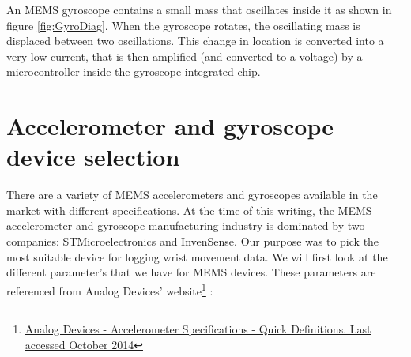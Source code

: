 An MEMS gyroscope contains a small mass that oscillates inside it as shown in figure \ref{fig:GyroDiag}. When the gyroscope rotates, the oscillating mass is displaced between two oscillations. This change in location is converted into a very low current, that is then amplified (and converted to a voltage) by a microcontroller inside the gyroscope integrated chip.

\section{Accelerometer and gyroscope device selection}
There are a variety of MEMS accelerometers and gyroscopes available in the market
with different specifications.
At the time of this writing, the MEMS accelerometer and gyroscope
manufacturing industry is dominated by two companies:
STMicroelectronics and InvenSense.
Our purpose was to pick the most suitable device for logging wrist movement data.
We will first look at the different parameter's that we have for MEMS devices. These parameters are referenced from Analog Devices' website\footnote{\href{http://www.analog.com/en/content/td_accelerometer_specifications_definitions/fca.html}{Analog Devices - Accelerometer Specifications - Quick Definitions. Last accessed October 2014}} :

